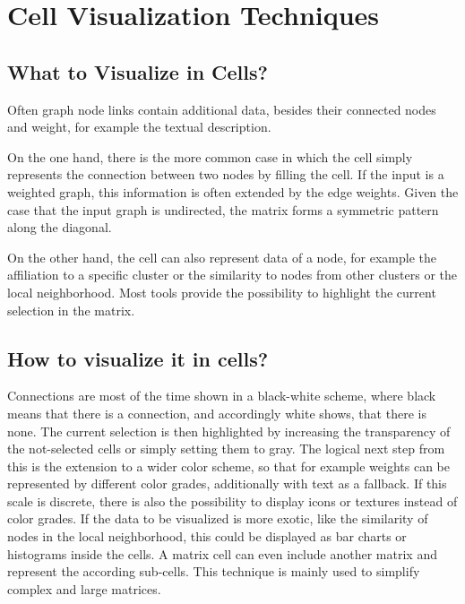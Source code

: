%
%
% 
% 
% 


\chapter{Cell Visualization Techniques}\label{chap:celltypes}


\section{What to Visualize in Cells?}
Often graph node links contain additional data, besides their connected nodes and weight, for example the textual description.

On the one hand, there is the more common case in which the cell simply represents the connection between two nodes by filling the cell. If the input is a weighted graph, this information is often extended by the edge weights. Given the case that the input graph is undirected, the matrix forms a symmetric pattern along the diagonal. 

On the other hand, the cell can also represent data of a node, for example the affiliation to a specific cluster or the similarity to nodes from other clusters or the local neighborhood. 
Most tools provide the possibility to highlight the current selection in the matrix.

\section{How to visualize it in cells?}

Connections are most of the time shown in a black-white scheme, where black means that there is a connection, and accordingly white shows, that there is none. The current selection is then highlighted by increasing the transparency of the not-selected cells or simply setting them to gray. The logical next step from this is the extension to a wider color scheme, so that for example weights can be represented by different color grades, additionally with text as a fallback. If this scale is discrete, there is also the possibility to display icons or textures instead of color grades.
If the data to be visualized is more exotic, like the similarity of nodes in the local neighborhood, this could be displayed as bar charts or histograms inside the cells. A matrix cell can even include another matrix and represent the according sub-cells. This technique is mainly used to simplify complex and large matrices.


